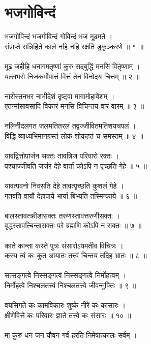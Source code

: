 \section{\color{blue}\sanskrit भजगोविन्दं}
\sanskrit
भजगोविन्दं भजगोविन्दं गोविन्दं भज मूढमते ।\\
संप्राप्ते सन्निहिते काले नहि नहि रक्षति डुकृञ्करणे ॥ १ ॥\\
\\
मूढ जहीहि धनागमतृष्णां कुरु सद्बुद्धिं मनसि वितृष्णाम् ।\\
यल्लभसे निजकर्मोपात्तं वित्तं तेन विनोदय चित्तम् ॥ २ ॥\\
\\
नारीस्तनभर नाभीदेशं दृष्ट्वा मागामोहावेशम् ।\\
एतन्मांसावसादि विकारं मनसि विचिन्तय वारं वारम् ॥ ३ ॥\\
\\
नलिनीदलगत जलमतितरलं तद्वज्जीवितमतिशयचपलं ।\\
विद्धि व्याध्यभिमानग्रस्तं लोकं शोकहतं च समस्तम् ॥ ४ ॥\\
\\
यावद्वित्तोपार्जन सक्तः तावन्निज परिवारो रक्तः ।\\
पश्चाज्जीवति जर्जर देहे वार्तां कोऽपि न पृच्छति गेहे ॥ ५ ॥\\
\\
यावत्पवनो निवसति देहे तावत्पृच्छति कुशलं गेहे ।\\
गतवति वायौ देहापाये भार्या बिभ्यति तस्मिन्काये ॥ ६ ॥\\
\\
बालस्तावत्क्रीडासक्तः तरुणस्तावत्तरुणीसक्तः ।\\
वृद्धस्तावत्चिन्तासक्तः परे ब्रह्मणि कोऽपि न सक्तः ॥ ७ ॥\\
\\
काते कान्ता कस्ते पुत्रः संसारोऽयमतीव विचित्रः ।\\
कस्य त्वं कः कुत आयातः तत्त्वं चिन्तय तदिह भ्रातः ॥ ८ ॥\\
\\
सत्सङ्गत्वे निस्सङ्गत्वं निस्सङ्गत्वे निर्मोहत्वम् ।\\
निर्मोहत्वे निश्चलतत्त्वं निश्चलतत्त्वे जीवन्मुक्तिः ॥ ९ ॥\\
\\
वयसिगते कः कामविकारः शुष्के नीरे कः कासारः ।\\
क्षीणेवित्ते कः परिवारः ज्ञाते तत्त्वे कः संसारः ॥ १० ॥\\
\\
मा कुरु धन जन यौवन गर्वं हरति निमेषात्कालः सर्वम् ।\\
